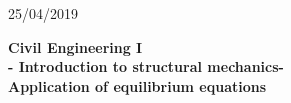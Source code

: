 \documentclass[10pt,a4j]{article}
\newlength{\minitwocolumn}
\begin{document}
\newcommand{\fat}[1]{\mbox{\boldmath $#1$}}
\newcommand{\D}{\partial}
\newcommand{\w}{\omega}
\newcommand{\ga}{\alpha}
\newcommand{\gb}{\beta}
\newcommand{\gx}{\xi}
\newcommand{\gz}{\zeta}
\newcommand{\vhat}[1]{\hat{\fat{#1}}}
\newcommand{\spc}{\vspace{0.7\baselineskip}}
\newcommand{\halfspc}{\vspace{0.3\baselineskip}}

\newcommand{\twofig}[2]
 {
   \begin{figure}
     \begin{minipage}[t]{\minitwocolumn}
         \begin{center}   #1
         \end{center}
     \end{minipage}
         \hspace{\columnsep}
     \begin{minipage}[t]{\minitwocolumn}
         \begin{center} #2
         \end{center}
     \end{minipage}
   \end{figure}
 }
\begin{flushright}
	25/04/2019
\end{flushright}
\begin{center}
	{\Large \bf Civil Engineering I \\
	- Introduction to structural mechanics-\\
	Application of equilibrium equations 
	}  \\
\end{center}
\vspace{1.5cm}
\end{document}
